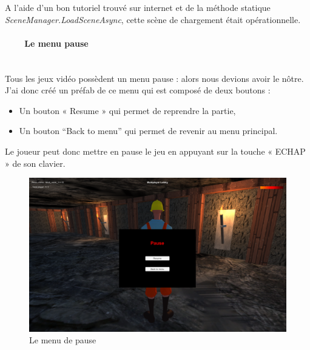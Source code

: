 \documentclass[titlepage, 13px, a4paper]{report}
\begin{document}
A l’aide d’un bon tutoriel trouvé sur internet et de la méthode statique \textit{SceneManager.LoadSceneAsync}, cette scène 
de chargement était opérationnelle. \\


\paragraph{~~~~Le menu pause} \hspace{0pt} \\
Tous les jeux vidéo possèdent un menu pause : alors nous devions avoir le nôtre.
J’ai donc créé un préfab de ce menu qui est composé de deux boutons : \\
{\begin{itemize}
	\item Un bouton « Resume » qui permet de reprendre la partie,
	\item Un bouton “Back to menu” qui permet de revenir au menu principal. \\
\end{itemize}}
Le joueur peut donc mettre en pause le jeu en appuyant sur la touche « ECHAP » de son clavier. \\

\begin{figure}[h!]
  \centering
  \includegraphics[scale=0.28]{images/cedric_pausemenu.png}
  \caption{Le menu de pause}
\end{figure}
\end{document}
